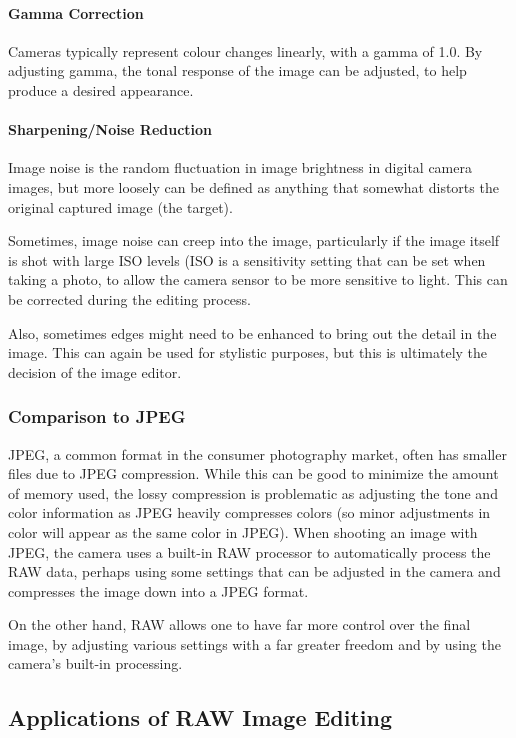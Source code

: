 \documentclass[10pt,a4paper]{article}
\begin{document}
\paragraph{Gamma Correction}
Cameras typically represent colour changes linearly, with a gamma of 1.0. 
By adjusting gamma, the tonal response of the image can be adjusted, to help produce a desired appearance.
\paragraph{Sharpening/Noise Reduction}
Image noise is the random fluctuation in image brightness in digital camera images, but more loosely can be defined as anything that somewhat distorts
the original captured image (the target).

Sometimes, image noise can creep into the image, particularly if the image itself is shot with large ISO levels (ISO is a sensitivity setting that can be
set when taking a photo, to allow the camera sensor to be more sensitive to light. This can be corrected during the editing process. 

Also, sometimes edges might need to be enhanced to bring out the detail in the image. This can again be used for stylistic purposes, but this is ultimately the
decision of the image editor. 
 
\subsubsection{Comparison to JPEG}
JPEG, a common format in the consumer photography market, often has smaller files due to JPEG compression.
While this can be good to minimize the amount of memory used, the lossy compression is problematic as adjusting the tone
and color information as JPEG heavily compresses colors (so minor adjustments in color will appear as the same color in JPEG).
When shooting an image with JPEG, the camera uses a built-in RAW processor to automatically process the RAW data, perhaps using some settings
that can be adjusted in the camera and compresses the image down into a JPEG format.

On the other hand, RAW allows one to have far more control over the final image, by adjusting various settings with a far greater freedom and by using the camera's
built-in processing.

\cite{UnderstandingRAWCapture}

\subsection{Applications of RAW Image Editing}
\end{document}
